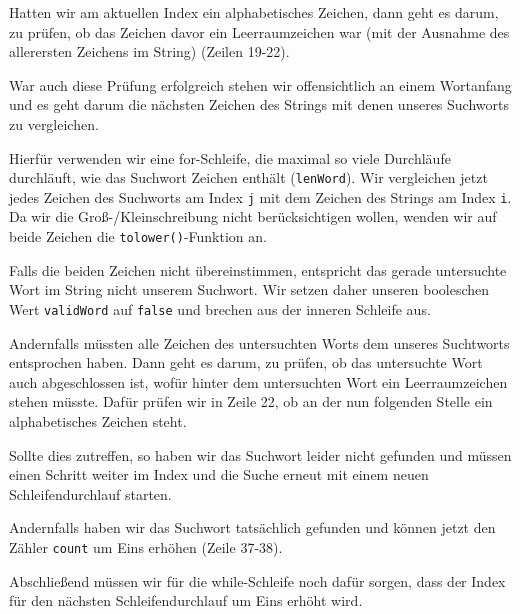 Hatten wir am aktuellen Index ein alphabetisches Zeichen, dann geht es darum, zu
prüfen, ob das Zeichen davor ein Leerraumzeichen war (mit der Ausnahme des
allerersten Zeichens im String) (Zeilen 19-22).

War auch diese Prüfung erfolgreich stehen wir offensichtlich an einem Wortanfang
und es geht darum die nächsten Zeichen des Strings mit denen unseres Suchworts
zu vergleichen.

Hierfür verwenden wir eine for-Schleife, die maximal so viele Durchläufe
durchläuft, wie das Suchwort Zeichen enthält (\texttt{lenWord}). Wir
vergleichen jetzt jedes Zeichen des Suchworts am Index \texttt{j} mit dem
Zeichen des Strings am Index \texttt{i}. Da wir die Groß-/Kleinschreibung
nicht berücksichtigen wollen, wenden wir auf beide Zeichen die
\texttt{tolower()}-Funktion an.

Falls die beiden Zeichen nicht übereinstimmen, entspricht das gerade untersuchte
Wort im String nicht unserem Suchwort. Wir setzen daher unseren booleschen Wert
\texttt{validWord} auf \texttt{false} und brechen aus der inneren
Schleife aus.

Andernfalls müssten alle Zeichen des untersuchten Worts dem unseres Suchtworts
entsprochen haben. Dann geht es darum, zu prüfen, ob das untersuchte Wort auch
abgeschlossen ist, wofür hinter dem untersuchten Wort ein Leerraumzeichen stehen
müsste. Dafür prüfen wir in Zeile 22, ob an der nun folgenden Stelle ein
alphabetisches Zeichen steht.

Sollte dies zutreffen, so haben wir das Suchwort leider nicht gefunden und
müssen einen Schritt weiter im Index und die Suche erneut mit einem neuen
Schleifendurchlauf starten.

Andernfalls haben wir das Suchwort tatsächlich gefunden und können jetzt den
Zähler \texttt{count} um Eins erhöhen (Zeile 37-38).

Abschließend müssen wir für die while-Schleife noch dafür sorgen, dass der Index
für den nächsten Schleifendurchlauf um Eins erhöht wird.

